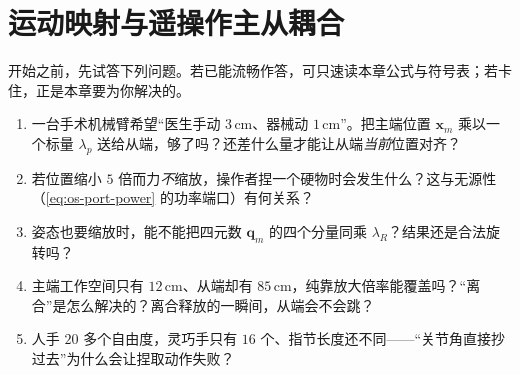 \chapter{运动映射与遥操作主从耦合}
\label{ch:teleop-mapping}


\begin{practice}[前置自测]
开始之前，先试答下列问题。若已能流畅作答，可只速读本章公式与符号表；若卡住，正是本章要为你解决的。
\begin{enumerate}
  \item 一台手术机械臂希望“医生手动 $3\,$cm、器械动 $1\,$cm”。把主端位置 $\mathbf{x}_m$ 乘以一个标量 $\lambda_p$ 送给从端，够了吗？还差什么量才能让从端\emph{当前}位置对齐？
  \item 若位置缩小 $5$ 倍而力\emph{不}缩放，操作者捏一个硬物时会发生什么？这与无源性（\cref{eq:os-port-power} 的功率端口）有何关系？
  \item 姿态也要缩放时，能不能把四元数 $\mathbf{q}_m$ 的四个分量同乘 $\lambda_R$？结果还是合法旋转吗？
  \item 主端工作空间只有 $12\,$cm、从端却有 $85\,$cm，纯靠放大倍率能覆盖吗？“离合”是怎么解决的？离合释放的一瞬间，从端会不会跳？
  \item 人手 $20$ 多个自由度，灵巧手只有 $16$ 个、指节长度还不同——“关节角直接抄过去”为什么会让捏取动作失败？
\end{enumerate}
\end{practice}

